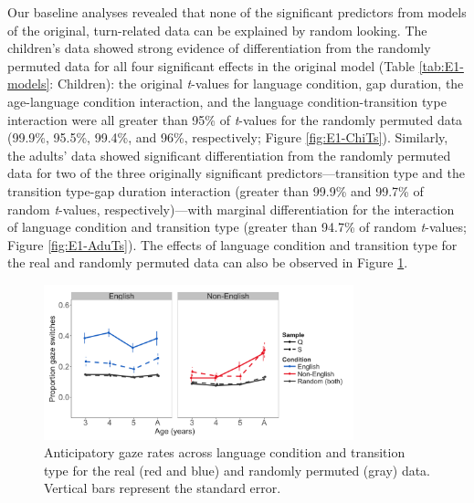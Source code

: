 \documentclass[authoryear, 12pt]{elsarticle}
\begin{document}
Our baseline analyses revealed that none of the significant predictors from models of the original, turn-related data can be explained by random looking. The children's data showed strong evidence of differentiation from the randomly permuted data for all four significant effects in the original model (Table \ref{tab:E1-models}: Children):  the original \textit{t}-values for language condition, gap duration, the age-language condition interaction, and the language condition-transition type interaction were all greater than 95\% of \textit{t}-values for the randomly permuted data (99.9\%, 95.5\%, 99.4\%, and 96\%, respectively; Figure \ref{fig:E1-ChiTs}). Similarly, the adults' data showed significant differentiation from the randomly permuted data for two of the three originally significant predictors---transition type and the transition type-gap duration interaction (greater than 99.9\% and 99.7\% of random \textit{t}-values, respectively)---with marginal differentiation for the interaction of language condition and transition type (greater than 94.7\% of random \textit{t}-values; Figure \ref{fig:E1-AduTs}). The effects of language condition and transition type for the real and randomly permuted data can also be observed in Figure \ref{fig:E1-randvsreal}.

\begin{figure}[h]
\begin{center}
\includegraphics[width=0.8\textwidth]{figures/E1-samples-by-lang-groups-trans-types.png}
\end{center}
\caption{Anticipatory gaze rates across language condition and transition type for the real (red and blue) and randomly permuted (gray) data. Vertical bars represent the standard error.} 
\label{fig:E1-randvsreal}
\end{figure}
\end{document}
